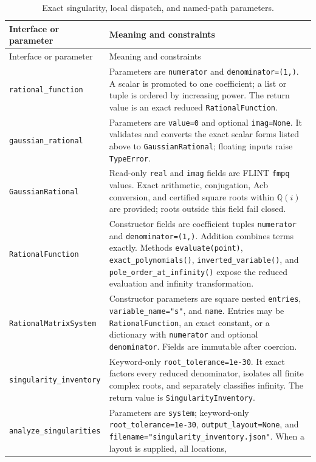 \documentclass[11pt]{article}
\begin{document}
\small
\begin{longtable}{L{0.36\textwidth}L{0.58\textwidth}}
\caption{Exact singularity, local dispatch, and named-path parameters.}\label{tab:routing-api}\\
\toprule
Interface or parameter & Meaning and constraints \\
\midrule
\endfirsthead
\toprule
Interface or parameter & Meaning and constraints \\
\midrule
\endhead
\texttt{rational\_function} & Parameters are \texttt{numerator} and
\texttt{denominator=(1,)}.  A scalar is promoted to one coefficient; a list or tuple is
ordered by increasing power.  The return value is an exact reduced
\texttt{RationalFunction}. \\
\texttt{gaussian\_rational} & Parameters are \texttt{value=0} and optional
\texttt{imag=None}.  It validates and converts the exact scalar forms listed above to
\texttt{GaussianRational}; floating inputs raise \texttt{TypeError}. \\
\texttt{GaussianRational} & Read-only \texttt{real} and \texttt{imag} fields are FLINT
\texttt{fmpq} values.  Exact arithmetic, conjugation, Acb conversion, and certified square
roots within $\mathbb Q(i)$ are provided; roots outside this field fail closed. \\
\texttt{RationalFunction} & Constructor fields are coefficient tuples \texttt{numerator}
and \texttt{denominator=(1,)}.  Addition combines terms exactly.  Methods
\texttt{evaluate(point)}, \texttt{exact\_polynomials()},
\texttt{inverted\_variable()}, and \texttt{pole\_order\_at\_infinity()} expose the reduced
evaluation and infinity transformation. \\
\texttt{RationalMatrixSystem} & Constructor parameters are square nested \texttt{entries},
\texttt{variable\_name="s"}, and \texttt{name}.  Entries may be
\texttt{RationalFunction}, an exact constant, or a dictionary with \texttt{numerator} and
optional \texttt{denominator}.  Fields are immutable after coercion. \\
\texttt{singularity\_inventory} & Keyword-only \texttt{root\_tolerance=1e-30}.  It exact
factors every reduced denominator, isolates all finite complex roots, and separately
classifies infinity.  The return value is \texttt{SingularityInventory}. \\
\texttt{analyze\_singularities} & Parameters are \texttt{system}; keyword-only
\texttt{root\_tolerance=1e-30}, \texttt{output\_layout=None}, and
\texttt{filename="singularity\_inventory.json"}.  When a layout is supplied, all locations,

\end{longtable}
\end{document}
